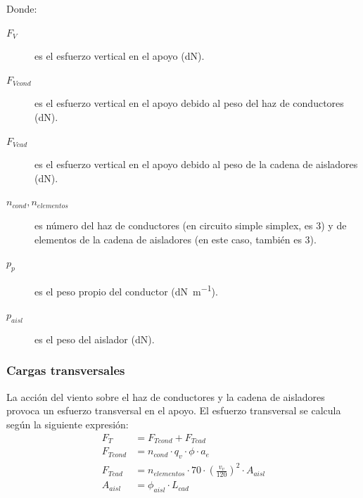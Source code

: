 Donde:
\begin{description}
    \item[$F_V$] es el esfuerzo vertical en el apoyo (\si{\deca\newton}).
    \item[$F_{Vcond}$] es el esfuerzo vertical en el apoyo debido al peso del haz de conductores (\si{\deca\newton}).
    \item[$F_{Vcad}$] es el esfuerzo vertical en el apoyo debido al peso de la cadena de aisladores (\si{\deca\newton}).
    \item[$n_{cond}, n_{elementos}$] es número del haz de conductores (en circuito simple simplex, es 3) y de elementos de la cadena de aisladores (en este caso, también es 3).
    \item[$p_p$] es el peso propio del conductor (\si{\deca\newton\per\meter}).
    \item[$p_{aisl}$] es el peso del aislador (\si{\deca\newton}).
\end{description}
\subsubsection{Cargas transversales}
\label{subsubsec:apoyos-cargasT}
La acción del viento sobre el haz de conductores y la cadena de aisladores provoca un esfuerzo transversal en el apoyo. El esfuerzo transversal se calcula según la siguiente expresión:
\begin{align}
    F_T &= F_{Tcond} + F_{Tcad}
    \label{eq:esfuerzo-transversal}\\[0.5em]
    F_{Tcond} &= n_{cond}\cdot q_v\cdot\phi\cdot a_e
    \label{eq:esfuerzo-transversal-conductor}\\[0.5em]
    F_{Tcad} &= n_{elementos}\cdot 70\cdot (\frac{v_v}{120})^2 \cdot A_{aisl}
    \label{eq:esfuerzo-transversal-cadena}\\[0.5em]
    A_{aisl} &= \phi_{aisl} \cdot L_{cad}
    \label{eq:superficie-cadena}
\end{align}

